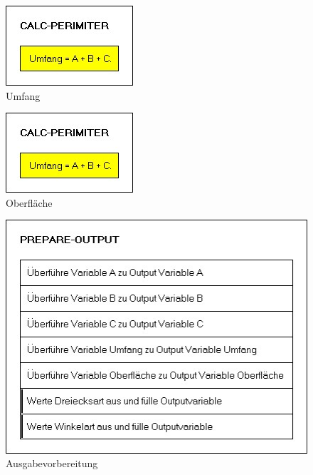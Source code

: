 \begin{figure}
    \centering
    \includegraphics[width=\linewidth]{images/CALC-PERIMITER.jpg}
    \caption{Umfang}
\end{figure}

\begin{figure}
    \centering
    \includegraphics[width=\linewidth]{images/CALC-PERIMITER.jpg}
    \caption{Oberfläche}
\end{figure}

\begin{figure}
    \centering
    \includegraphics[width=\linewidth]{images/Prepare Output.jpg}
    \caption{Ausgabevorbereitung}
\end{figure}

